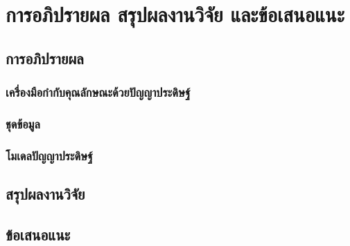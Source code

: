 
\chapter{การอภิปรายผล สรุปผลงานวิจัย และข้อเสนอแนะ}

\section{การอภิปรายผล}
\subsection{เครื่องมือกำกับคุณลักษณะด้วยปัญญาประดิษฐ์}


\subsection{ชุดข้อมูล}

\subsection{โมเดลปัญญาประดิษฐ์}

\section{สรุปผลงานวิจัย}
\section{ข้อเสนอแนะ}